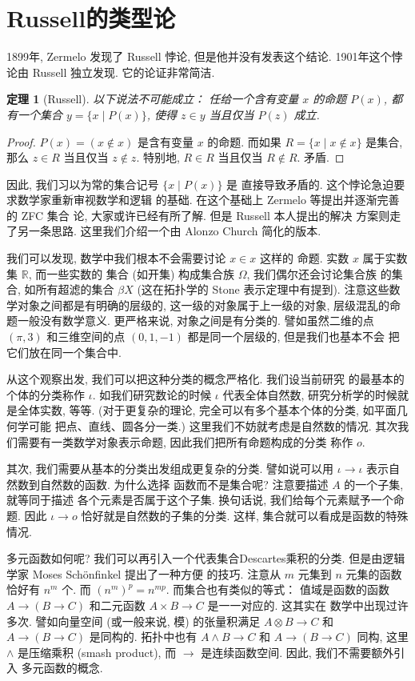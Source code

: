 \documentclass[UTF8]{ctexbook}
\theoremstyle{plain}
\newtheorem{theorem}{定理}[chapter]
\theoremstyle{definition}
\theoremstyle{remark}
\begin{document}
\section{Russell的类型论} %
1899年, Zermelo 发现了 Russell 悖论,
但是他并没有发表这个结论.
1901年这个悖论由 Russell 独立发现.
它的论证非常简洁.
\begin{theorem}[Russell]
以下说法不可能成立： 任给一个含有变量 \(x\) 的命题 \(P(x)\),
都有一个集合 \(y = \{x \mid P(x)\}\), 使得
\(z \in y\) 当且仅当 \(P(z)\) 成立.
\end{theorem}
\begin{proof}
\(P(x) = (x \notin x)\) 是含有变量 \(x\) 的命题.
而如果 \(R = \{x \mid x \notin x\}\) 是集合,
那么 \(z \in R\) 当且仅当 \(z \notin z\).
特别地, \(R \in R\) 当且仅当 \(R \notin R\).
矛盾.
\end{proof}
因此, 我们习以为常的集合记号 \(\{x \mid P(x)\}\) 是
直接导致矛盾的. 这个悖论急迫要求数学家重新审视数学和逻辑
的基础. 在这个基础上 Zermelo 等提出并逐渐完善的 ZFC 集合
论, 大家或许已经有所了解. 但是 Russell 本人提出的解决
方案则走了另一条思路. 这里我们介绍一个由 Alonzo Church 简化的版本.%
~\cite{sep:2022:typetheory}

我们可以发现, 数学中我们根本不会需要讨论 \(x \in x\) 这样的
命题. 实数 \(x\) 属于实数集 \(\mathbb R\), 而一些实数的
集合 (如开集) 构成集合族 \(\Omega\), 我们偶尔还会讨论集合族
的集合, 如所有超滤的集合 \(\beta X\) (这在拓扑学的
Stone 表示定理中有提到). 注意这些数学对象之间都是有明确的层级的,
这一级的对象属于上一级的对象, 层级混乱的命题一般没有数学意义.
更严格来说, 对象之间是有分类的. 譬如虽然二维的点 \((\pi, 3)\)
和三维空间的点 \((0,1,-1)\) 都是同一个层级的, 但是我们也基本不会
把它们放在同一个集合中.

从这个观察出发, 我们可以把这种分类的概念严格化. 我们设当前研究
的最基本的个体的分类称作 \(\iota\). 如我们研究数论的时候
\(\iota\) 代表全体自然数, 研究分析学的时候就是全体实数, 等等.
(对于更复杂的理论, 完全可以有多个基本个体的分类, 如平面几何学可能
把点、直线、圆各分一类.) 这里我们不妨就考虑是自然数的情况.
其次我们需要有一类数学对象表示命题, 因此我们把所有命题构成的分类
称作 \(o\).

其次, 我们需要从基本的分类出发组成更复杂的分类. 譬如说可以用
\(\iota \to \iota\) 表示自然数到自然数的函数. 为什么选择
函数而不是集合呢? 注意要描述 \(A\) 的一个子集, 就等同于描述
各个元素是否属于这个子集. 换句话说, 我们给每个元素赋予一个命题.
因此 \(\iota \to o\) 恰好就是自然数的子集的分类. 这样,
集合就可以看成是函数的特殊情况.

多元函数如何呢? 我们可以再引入一个代表集合Descartes乘积的分类.
但是由逻辑学家 Moses Sch\"onfinkel 提出了一种方便
的技巧. 注意从 \(m\) 元集到 \(n\)
元集的函数恰好有 \(n^m\) 个. 而 \((n^m)^p = n^{mp}\).
而集合也有类似的等式： 值域是函数的函数 \(A \to (B \to C)\)
和二元函数 \(A \times B \to C\) 是一一对应的. 这其实在
数学中出现过许多次. 譬如向量空间 (或一般来说, 模) 的张量积满足
\(A \otimes B \to C\) 和 \(A \to (B \to C)\) 是同构的.
拓扑中也有 \(A \wedge B \to C\) 和 \(A \to (B \to C)\)
同构, 这里 \(\wedge\) 是压缩乘积 (smash product), 而
\(\to\) 是连续函数空间. 因此, 我们不需要额外引入
多元函数的概念.
\end{document}
